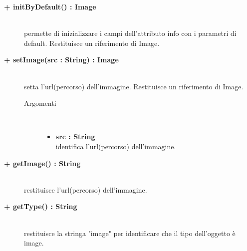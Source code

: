 \begin{description}
\begin{description}
\end{description}

\begin{description}
		\item[\textbf{\color{blue}+ initByDefault() : Image			}] \hfill \\
			permette di inizializzare i campi dell'attributo info con i parametri di default. Restituisce un riferimento di Image. 

\end{description}

\begin{description}
		\item[\textbf{\color{blue}+ setImage(src : String) : Image			}] \hfill \\
			setta l'url(percorso) dell'immagine. Restituisce un riferimento di Image.
			
		\begin{description}
			\item[Argomenti] \hfill \\
				\begin{itemize}
				
					\item \textbf{src : String			} \hfill \\
					identifica l'url(percorso) dell'immagine.
				\end{itemize}
		\end{description}

\end{description}

\begin{description}
		\item[\textbf{\color{blue}+ getImage() : String			}] \hfill \\
			restituisce l'url(percorso) dell'immagine. 

\end{description}

\begin{description}
		\item[\textbf{\color{blue}+ getType() : String			}] \hfill \\
			restituisce la stringa "image" per identificare che il tipo dell'oggetto è image. 

\end{description}



\end{description}



